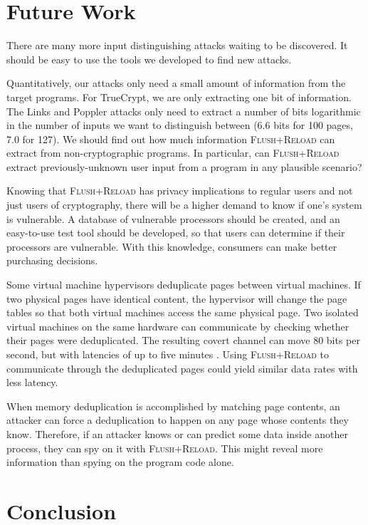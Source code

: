 \documentclass[letterpaper,twocolumn,10pt]{article}
\begin{document}
\section{Future Work}
\label{sec:future}

There are many more input distinguishing attacks waiting to be discovered. It
should be easy to use the tools we developed to find new attacks.

Quantitatively, our attacks only need a small amount of information from the
target programs. For TrueCrypt, we are only extracting one bit of information.
The Links and Poppler attacks only need to extract a number of bits logarithmic
in the number of inputs we want to distinguish between (6.6 bits for 100 pages,
7.0 for 127). We should find out how much information \textsc{Flush+Reload} can
extract from non-cryptographic programs. In particular, can
\textsc{Flush+Reload} extract previously-unknown user input from a program in
any plausible scenario?

Knowing that \textsc{Flush+Reload} has privacy implications to regular users and
not just users of cryptography, there will be a higher demand to know if one's
system is vulnerable. A database of vulnerable processors should be created, and
an easy-to-use test tool should be developed, so that users can determine if
their processors are vulnerable. With this knowledge, consumers can make better
purchasing decisions.

Some virtual machine hypervisors deduplicate pages between virtual machines. If
two physical pages have identical content, the hypervisor will change the page
tables so that both virtual machines access the same physical page. Two isolated
virtual machines on the same hardware can communicate by checking whether their
pages were deduplicated. The resulting covert channel can move 80 bits per
second, but with latencies of up to five minutes \cite{xiao2013security}. Using
\textsc{Flush+Reload} to communicate through the deduplicated pages could yield
similar data rates with less latency.

When memory deduplication is accomplished by matching page contents, an attacker
can force a deduplication to happen on any page whose contents they know.
Therefore, if an attacker knows or can predict some data inside another process,
they can spy on it with \textsc{Flush+Reload}. This might reveal more
information than spying on the program code alone.

\section{Conclusion}
\label{sec:conclusion}
\end{document}
